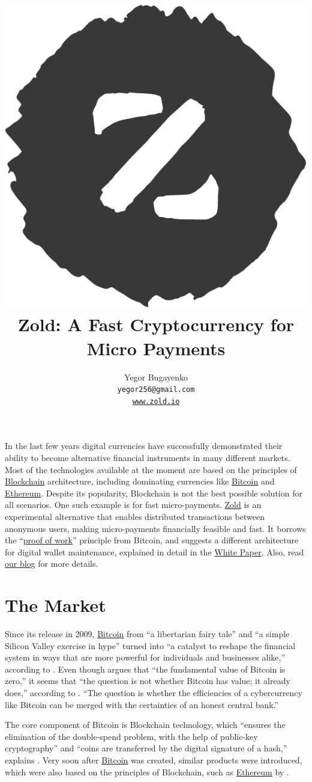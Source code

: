 \documentclass{main}
\title{\includegraphics[scale=0.3]{../images/logo.pdf}\\
  Zold: A Fast Cryptocurrency for Micro Payments\\
  {\small\colorbox{dgreen}{\color{lgreen}{Green Paper}}}}
\author{Yegor Bugayenko\\
  \texttt{yegor256@gmail.com}\\
  \href{https://www.zold.io}{\texttt{www.zold.io}}\\[1em]
  \href{https://github.com/zold-io/papers/releases/tag/\zoldversion}{\texttt{\zoldversion}}}
\begin{document}
\maketitle

In the last few years digital currencies have successfully demonstrated
their ability to become alternative financial instruments in many
different markets. Most of the technologies available at the moment are
based on the principles of \href{https://en.wikipedia.org/wiki/Blockchain}{Blockchain} architecture, including
dominating currencies like \href{https://bitcoin.org/}{Bitcoin} and
\href{https://ethereum.org/}{Ethereum}. Despite its
popularity, Blockchain is not the best possible solution for all scenarios.
One such example is for fast micro-payments.
\href{https://www.zold.io}{Zold} is an experimental alternative
that enables distributed transactions between
anonymous users, making micro-payments financially feasible and fast.
It borrows the ``\href{https://en.wikipedia.org/wiki/Proof-of-work_system}{proof of work}'' principle from Bitcoin,
and suggests a different architecture for digital wallet maintenance,
explained in detail in the \href{https://papers.zold.io}{White Paper}.
Also, read \href{https://blog.zold.io}{our blog} for more details.

\pagebreak

\section*{The Market}

Since its release in 2009, \href{https://bitcoin.org/}{Bitcoin} from
``a libertarian fairy tale'' and ``a simple Silicon Valley exercise in hype''
turned into ``a catalyst to reshape the financial system in ways that are more
powerful for individuals and businesses alike,'' according to .
Even though  argues that
``the fundamental value of Bitcoin is zero,''
it seems that ``the question is not whether Bitcoin has value; it already does,''
according to .
``The question is whether the efficiencies of a cybercurrency
like Bitcoin can be merged with the certainties of an honest central bank.''

The core component of Bitcoin is Blockchain technology, which
``ensures the elimination of the double-spend problem, with the help
of public-key cryptography'' and ``coins are transferred by the
digital signature of a hash,''
explains .
Very soon after \href{https://bitcoin.org/}{Bitcoin} was created, similar products were introduced,
which were also based on the principles of Blockchain, such as
\href{https://ethereum.org/}{Ethereum} by .
\end{document}
